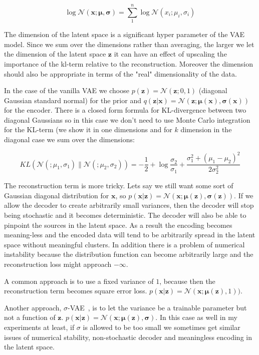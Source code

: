 \documentclass[11pt, a4paper]{report}
\theoremstyle{plain}
\theoremstyle{definition}
\theoremstyle{remark}
\newcommand{\x}{\mathbf{x}}
\newcommand{\z}{\mathbf{z}}
\newcommand{\NN}{\mathcal{N}}
\newcommand{\bv}[1]{\boldsymbol{#1}}
\begin{document}
\begin{equation}
\label{eq:diagnormal}
\log \NN(\x ; \bv{\mu}, \bv{\sigma}) = 
\sum_1^n \log \NN(x_i ; \mu_i, \sigma_i)
\end{equation}

The dimension of the latent space is a significant hyper parameter of the VAE
model.
Since we sum over the dimensions rather than averaging,
the larger we let the dimension of the latent space $\z$ 
it can have an effect of upscaling the importance of the kl-term relative to the
reconstruction.
Moreover the dimension should also be appropriate in terms of the "real"
dimensionality of the data.

In the case of the vanilla VAE we choose $p(\z) = \NN(\z;0,1)$ (diagonal
Gaussian standard normal) for the prior and 
$q(\z | \x) = \NN(\z ; \bv{\mu}(\x), \bv{\sigma}(\x))$ for the encoder.
There is a closed form formula for KL-divergence between two diagonal Gaussians
so in this case we don't need to use Monte Carlo integration for the KL-term
(we show it in one dimensions and for $k$ dimension in the diagonal case
we sum over the dimensions:

\begin{equation}
\label{eq:kldivnormal}
KL(\NN(;\mu_1, \sigma_1) \| \NN(;\mu_2, \sigma_2)) = 
-\frac{1}{2} + \log \frac{\sigma_2}{\sigma_1}
+ \frac{\sigma_1^2 + (\mu_1 - \mu_2)^2}{2 \sigma_2^2}
\end{equation}

The reconstruction term is more tricky.
Lets say we still want some sort of Gaussian diagonal distribution for $\x$,
so $p(\x | \z) = \NN(\x ; \bv{\mu}(\z), \bv{\sigma}(\z))$.
If we allow the decoder to create arbitrarily small variances, then the
decoder will stop being stochastic and it becomes deterministic. 
The decoder will also be able to pinpoint the sources in the latent space.
As a result the encoding becomes meaning-less and the encoded data will tend to
be arbitrarily spread in the latent space without meaningful clusters.
In addition there is a problem of numerical instability because the distribution
function can become arbitrarily large and the reconstruction loss might approach
$-\infty$.

A common approach is to use a fixed variance of $1$, because then the
reconstruction term becomes square error loss.
$p(\x | \z) = \NN(\x ; \bv{\mu}(\z), 1))$.

Another approach, $\sigma$-VAE~\cite{rybkin2021simple}, is to let the variance
be a trainable parameter but not a function of $\z$.
$p(\x | \z) = \NN(\x ; \bv{\mu}(\z), \bv{\sigma})$.
In this case as well in my experiments at least, if $\sigma$ is allowed to be
too small we sometimes get similar issues of numerical stability, 
non-stochastic decoder and meaningless 
encoding in the latent
space.
\end{document}

